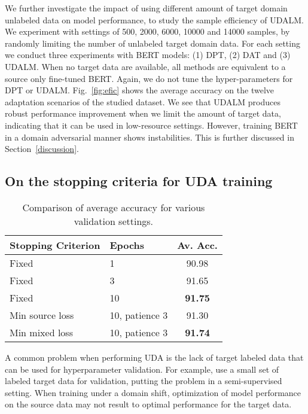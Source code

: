 \documentclass[11pt]{article}
\begin{document}
We further investigate the impact of using different amount of target domain unlabeled data on model performance, to study the sample efficiency of UDALM. We experiment with settings of 500, 2000, 6000, 10000 and 14000 samples, by randomly limiting the number of unlabeled target domain data. For each setting we conduct three experiments with BERT models: (1) DPT, (2) DAT and (3) UDALM. When no target data are available, all methods are equivalent to a source only fine-tuned BERT. Again, we do not tune the hyper-parameters for DPT or UDALM. Fig.~\ref{fig:efic} shows the average accuracy on the twelve adaptation scenarios of the studied dataset. We see that UDALM produces robust performance improvement when we limit the amount of target data, indicating that it can be used in low-resource settings. However, training BERT in a domain adversarial manner shows instabilities. This is further discussed in Section~\ref{discussion}. 

\subsection{On the stopping criteria for UDA training}

\begin{table}[b]
\centering
\begin{tabular}{|l l c|}
\hline
Stopping Criterion & Epochs & Av. Acc. \\
\hline
\hline
Fixed  & 1 & 90.98  \\
Fixed  & 3 & 91.65 \\
Fixed  & 10 & \textbf{91.75} \\
Min source loss & 10, patience 3 & 91.30 \\
Min mixed loss & 10, patience 3 & \textbf{91.74} \\
\hline
\end{tabular}
\caption{Comparison of average accuracy for various validation settings.}
\label{validation}
\end{table}



A common problem when performing UDA is the lack of target labeled data that can be used for hyperparameter validation. For example, \citet{ruder-plank-2018-strong} use a small set of labeled target data for validation, putting the problem in a semi-supervised setting. When training under a domain shift, optimization of model performance on the source data may not result to optimal performance for the target data. 
\end{document}

